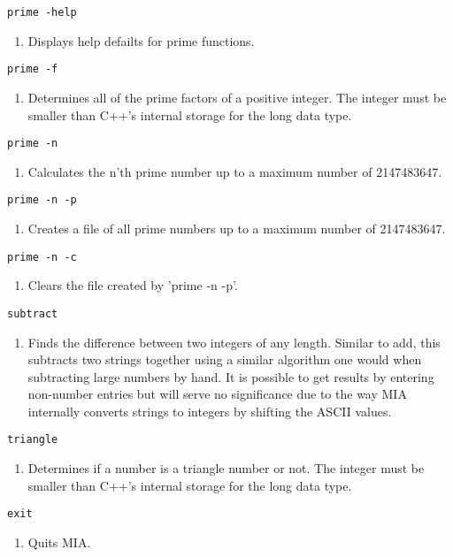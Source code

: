 \begin{lstlisting} 
prime -help
\end{lstlisting}
\begin{enumerate}
	\item[]  Displays help defailts for prime functions.
\end{enumerate}
\begin{lstlisting} 
prime -f   
\end{lstlisting}
\begin{enumerate}
	\item[] Determines all of the prime factors of a positive integer. The integer must be smaller than C++'s internal storage for the long data type.
\end{enumerate}
\begin{lstlisting} 
prime -n  
\end{lstlisting}
\begin{enumerate}
	\item[] Calculates the n'th prime number up to a maximum number of 2147483647.
\end{enumerate}
\begin{lstlisting} 
prime -n -p   
\end{lstlisting}
\begin{enumerate}
	\item[] Creates a file of all prime numbers up to a maximum number of 2147483647.
\end{enumerate}
\begin{lstlisting} 
prime -n -c   
\end{lstlisting}
\begin{enumerate}
	\item[] Clears the file created by 'prime -n -p'.
\end{enumerate}
\begin{lstlisting} 
subtract   
\end{lstlisting}
\begin{enumerate}
	\item[] Finds the difference between two integers of any length. Similar to add, this subtracts two strings together using a similar algorithm one would when subtracting large numbers by hand. It is possible to get results by entering non-number entries but will serve no significance due to the way MIA internally converts strings to integers by shifting the ASCII values.
\end{enumerate}
\begin{lstlisting} 
triangle   
\end{lstlisting}
\begin{enumerate}
	\item[] Determines if a number is a triangle number or not. The integer must be smaller than C++'s internal storage for the long data type.
\end{enumerate}
\begin{lstlisting} 
exit  
\end{lstlisting}
\begin{enumerate}
	\item[] Quits MIA. 
\end{enumerate}
